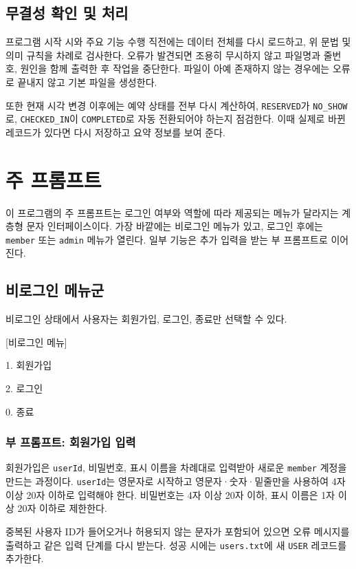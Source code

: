 \documentclass[a4paper,10pt]{article}
\begin{document}
\subsection{무결성 확인 및 처리}
프로그램 시작 시와 주요 기능 수행 직전에는 데이터 전체를 다시 로드하고, 위 문법 및 의미 규칙을 차례로 검사한다. 오류가 발견되면 조용히 무시하지 않고 파일명과 줄번호, 원인을 함께 출력한 후 작업을 중단한다. 파일이 아예 존재하지 않는 경우에는 오류로 끝내지 않고 기본 파일을 생성한다.

또한 현재 시각 변경 이후에는 예약 상태를 전부 다시 계산하여, \texttt{RESERVED}가 \texttt{NO\_SHOW}로, \texttt{CHECKED\_IN}이 \texttt{COMPLETED}로 자동 전환되어야 하는지 점검한다. 이때 실제로 바뀐 레코드가 있다면 다시 저장하고 요약 정보를 보여 준다.

\section{주 프롬프트}
이 프로그램의 주 프롬프트는 로그인 여부와 역할에 따라 제공되는 메뉴가 달라지는 계층형 문자 인터페이스이다. 가장 바깥에는 비로그인 메뉴가 있고, 로그인 후에는 \texttt{member} 또는 \texttt{admin} 메뉴가 열린다. 일부 기능은 추가 입력을 받는 부 프롬프트로 이어진다.

\subsection{비로그인 메뉴군}
비로그인 상태에서 사용자는 회원가입, 로그인, 종료만 선택할 수 있다.

\begin{menubox}
\small
[비로그인 메뉴]\par
1. 회원가입\par
2. 로그인\par
0. 종료
\end{menubox}

\subsubsection{부 프롬프트: 회원가입 입력}
회원가입은 \texttt{userId}, 비밀번호, 표시 이름을 차례대로 입력받아 새로운 \texttt{member} 계정을 만드는 과정이다. \texttt{userId}는 영문자로 시작하고 영문자·숫자·밑줄만을 사용하여 4자 이상 20자 이하로 입력해야 한다. 비밀번호는 4자 이상 20자 이하, 표시 이름은 1자 이상 20자 이하로 제한한다.

중복된 사용자 ID가 들어오거나 허용되지 않는 문자가 포함되어 있으면 오류 메시지를 출력하고 같은 입력 단계를 다시 받는다. 성공 시에는 \texttt{users.txt}에 새 \texttt{USER} 레코드를 추가한다.
\end{document}
